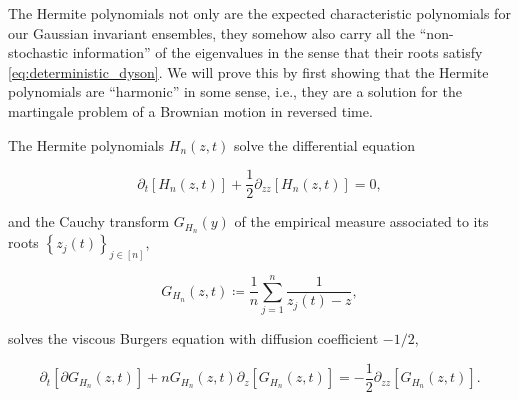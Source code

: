     The Hermite polynomials not only are the expected characteristic polynomials for our Gaussian invariant ensembles, they somehow also carry all the ``non-stochastic information'' of the eigenvalues in the sense that their roots satisfy \eqref{eq:deterministic_dyson}. We will prove this by first showing that the Hermite polynomials are ``harmonic'' in some sense, i.e., they are a solution for the martingale problem of a Brownian motion in reversed time.

\begin{theorem} \label{thm:heat_burgers}
    The Hermite polynomials $H_n(z,t)$ solve the differential equation

    \begin{equation} \label{eq:calor}
      \partial_t [H_n(z,t)] + \frac12 \partial_{zz}[H_n(z,t)] = 0,
    \end{equation}

    \noindent and the Cauchy transform $G_{H_n}(y)$ of the empirical measure associated to its roots $\left\{ z_j(t) \right\}_{j\in [n]}$, 
    
    \begin{equation*}
        G_{H_n}(z,t) \coloneqq \frac1n \sum_{j=1}^n \frac{1}{z_j(t) - z},
    \end{equation*}

    \noindent solves the viscous Burgers equation with diffusion coefficient $-1/2$,

    \begin{equation*} \label{eq:burgers_12}
        {\partial_t}[\partial G_{H_n}(z,t)] + nG_{H_n}(z,t)\partial_z[G_{H_n}(z,t)] = -\frac12  \partial_{zz}[G_{H_n}(z,t)].
    \end{equation*}
    
\end{theorem}


